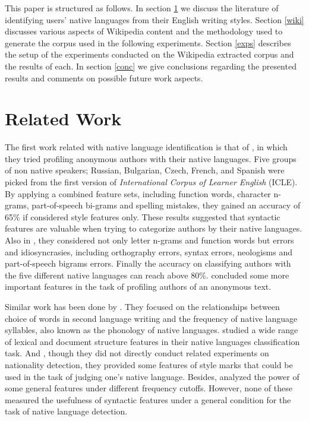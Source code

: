 \documentclass[10pt,a5paper,twoside]{article}
\begin{document}
This paper is structured as follows. In section \ref{rwork} we discuss the
literature of identifying users' native languages from their English writing
styles. Section \ref{wiki} discusses various aspects of Wikipedia content and
the methodology used to generate the corpus used in the following experiments.
Section \ref{exps} describes the setup of the experiments conducted on the
Wikipedia extracted corpus and the results of each. In section \ref{conc} we
give conclusions regarding the presented results and comments on possible future
work aspects.


\section{Related Work}
\label{rwork}
The first work related with native language identification is that of
\cite{koppel2005automatically}, in which they tried profiling anonymous authors
with their native languages. Five groups of non native speakers; Russian,
Bulgarian, Czech, French, and Spanish were picked from the first version of {\em
International Corpus of Learner English} (ICLE). By applying a combined feature
sets, including function words, character n-grams, part-of-speech bi-grams and
spelling mistakes, they gained an accuracy of 65\% if considered style features
only. These results suggested that syntactic features are valuable when trying
to categorize authors by their native languages. Also in \cite{koppel2005determining},
they considered not only letter n-grams and function
words but errors and idiosyncrasies, including orthography errors, syntax
errors, neologisms and part-of-speech bigrams errors. Finally the accuracy on
classifying authors with the five different native languages can reach above 80\%.
\cite{argamon2009automatically} concluded some more important features in the task of profiling authors of an anonymous text.

Similar work has been done by \cite{tsur2007using}. They focused on the
relationships between choice of words in second language writing and the
frequency of native language syllables, also known as the phonology of native
languages. \cite{estival2007author} studied a wide range of lexical and
document structure features in their native languages classification task. And
\cite {zheng2003authorship}, though they did not directly conduct related
experiments on nationality detection, they provided some features of style marks
that could be used in the task of judging one's native language. Besides, \cite {gamon2004linguistic}
analyzed the power of some general features under
different frequency cutoffs. However, none of these measured the usefulness of
syntactic features under a general condition for the task of native language
detection.
\end{document}
